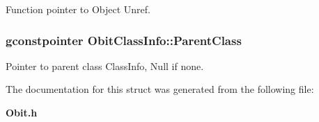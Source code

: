 Function pointer to Object Unref. 

\subsubsection{\setlength{\rightskip}{0pt plus 5cm}gconstpointer {\bf Obit\-Class\-Info::Parent\-Class}}\label{structObitClassInfo_o3}


Pointer to parent class Class\-Info, Null if none. 



The documentation for this struct was generated from the following file:\begin{CompactItemize}
\item 
{\bf Obit.h}\end{CompactItemize}
